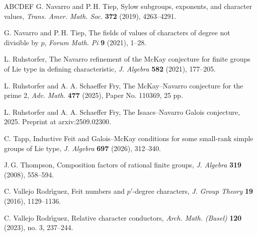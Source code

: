 \documentclass[12pt]{amsart}
\theoremstyle{definition}
\numberwithin{equation}{section}
\begin{document}
\begin{thebibliography}{ABCDEF}
{\sc G. Navarro and P.\,H. Tiep}, Sylow subgroups, exponents, and
character values,
  \emph{Trans. Amer. Math. Soc.} \textbf{372} (2019), 4263--4291.

{\sc G. Navarro and P.\,H. Tiep}, The fields of values of characters
of degree not divisible by $p$, \emph{Forum Math. Pi} \textbf{9}
(2021), 1--28.

{\sc L. Ruhstorfer}, The Navarro refinement of the McKay conjecture
for finite groups of Lie type in defining characteristic, \emph{J.
Algebra} \textbf{582} (2021), 177--205.

{\sc L. Ruhstorfer and A. A. Schaeffer Fry}, The McKay--Navarro
conjecture for the prime 2, \emph{Adv. Math.} \textbf{477} (2025),
Paper No. 110369, 25 pp.

{\sc L. Ruhstorfer and A. A. Schaeffer Fry}, The Isaacs--Navarro
Galois conjecture, 2025. Preprint at arxiv:2509.02300.

{\sc C. Tapp}, Inductive Feit and Galois--McKay conditions for some
small-rank simple groups of Lie type, \emph{J. Algebra} \textbf{697}
(2026), 312--340.

{\sc J.\,G. Thompson}, Composition factors of rational finite
groups, \emph{J. Algebra} \textbf{319} (2008), 558--594.

{\sc C. Vallejo Rodr\'{\i}guez}, Feit numbers and $p'$-degree
characters, \emph{J. Group Theory} \textbf{19} (2016), 1129--1136.

{\sc C. Vallejo Rodr\'{\i}guez}, Relative character conductors,
\emph{Arch. Math. (Basel)} \textbf{120} (2023), no. 3, 237--244.

\end{thebibliography}
\end{document}
